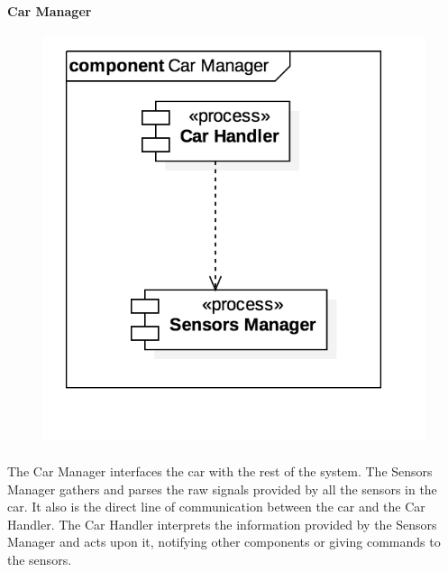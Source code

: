 		\paragraph{Car Manager}
			\begin{figure}[h]
				\includegraphics[scale=0.4, center]{img/component_diagrams/07_car_manager.png}
			\end{figure}
		
		\paragraph{} The Car Manager interfaces the car with the rest of the system. The Sensors Manager gathers and parses the raw signals provided by all the sensors in the car. It also is the direct line of communication between the car and the Car Handler. The Car Handler interprets the information provided by the Sensors Manager and acts upon it, notifying other components or giving commands to the sensors. 
\FloatBarrier
		
		
		
		
